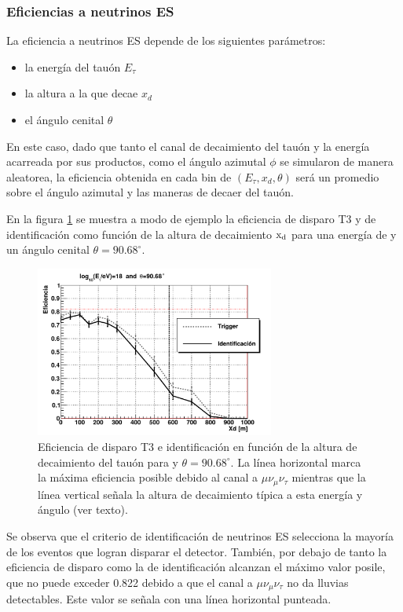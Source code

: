 	\subsubsection{Eficiencias a neutrinos ES}
	
	La eficiencia a neutrinos ES depende de los siguientes parámetros:
	\begin{itemize}
	 \item la energía del tauón $E_\tau$
	 \item la altura a la que decae $x_d$
	 \item el ángulo cenital $\theta$
	\end{itemize}
	En este caso, dado que tanto el canal de decaimiento del tauón y la energía acarreada por sus productos, como el ángulo azimutal $\phi$ se simularon de manera aleatorea, la eficiencia obtenida en cada bin de $(E_\tau,x_d,\theta)$ será un promedio sobre el ángulo azimutal y las maneras de decaer del tauón.
	
	En la figura \ref{fig:effES_tr_id} se muestra a modo de ejemplo la eficiencia de disparo T3 y de identificación como función de la altura de decaimiento $\rm x_d$ para una energía de  y un ángulo cenital $\theta=90.68^\circ$.
	\begin{figure}[ht!]
		\begin{center}
			\includegraphics[width=0.7\textwidth]{fig/resultadosAuger/eff_18_8931_forThesis}
			\caption{Eficiencia de disparo T3 e identificación en función de la altura de decaimiento del tauón para  y $\theta=90.68^\circ$. La línea horizontal marca la máxima eficiencia posible debido al canal a $\mu\nu_\mu\nu_\tau$ mientras que la línea vertical señala la altura de decaimiento típica a esta energía y ángulo (ver texto).}
			\label{fig:effES_tr_id}
		\end{center}
	\end{figure}
	Se observa que el criterio de identificación de neutrinos ES selecciona la mayoría de los eventos que logran disparar el detector.
	También, por debajo de  tanto la eficiencia de disparo como la de identificación alcanzan el máximo valor posile, que no puede exceder 0.822 debido a que el canal a $\mu\nu_\mu\nu_\tau$ no da lluvias detectables.
	Este valor se señala con una línea horizontal punteada.
	
